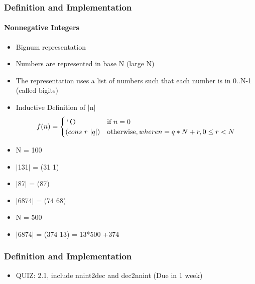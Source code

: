 \documentclass{beamer}
\newcommand{\elist}{\texttt{\textquotesingle{()}}}
\begin{document}
\begin{frame}[fragile]
\frametitle{Definition and Implementation}
\framesubtitle{Nonnegative Integers}
\begin{scriptsize}
\begin{itemize}
\item<1-> Bignum representation

\item<2-> Numbers are represented in base N (large N)

\item<2-> The representation uses a list of numbers such that each number is in 0..N-1 (called bigits)

\item<3-> Inductive Definition of $|$n$|$
\begin{equation*}
f(n)=\begin{cases}
       \elist{} & \text{if \(n=0\)} \\
       (cons \ r \ |q|) & \text{otherwise}, where n = q*N + r, 0 \leq r < N
     \end{cases}
\end{equation*}

\item<4-> N = 100

\item<4-> $|$131$|$ = (31 1)	

\item<4-> $|$87$|$ = (87)		

\item<4-> $|$6874$|$ = (74 68)

\item<5-> N = 500

\item<5-> $|$6874$|$ = (374  13) = 13*500 +374


\end{itemize}
\end{scriptsize}
\end{frame}

\begin{frame}[fragile]
\frametitle{Definition and Implementation}
\begin{scriptsize}
\begin{itemize}

\item<1-> QUIZ: 2.1, include nnint2dec and dec2nnint (Due in 1 week)

\end{itemize}
\end{scriptsize}
\end{frame}
\end{document}
